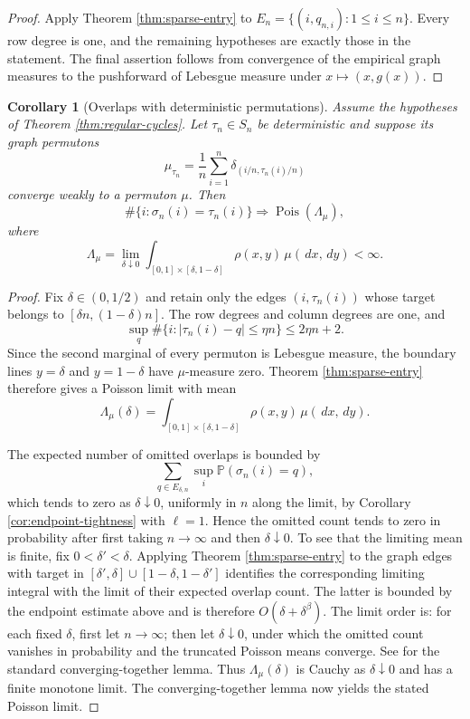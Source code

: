 \documentclass[11pt]{article}
\newtheorem{corollary}[theorem]{Corollary}
\theoremstyle{remark}
\newcommand{\Pp}{\mathbb P}
\newcommand{\Pois}{\operatorname{Pois}}
\newcommand{\dd}{\,d}
\begin{document}
\begin{proof}
Apply Theorem \ref{thm:sparse-entry} to
$E_n=\{(i,q_{n,i}):1\le i\le n\}$.  Every row degree is one, and the remaining
hypotheses are exactly those in the statement.  The final assertion follows
from convergence of the empirical graph measures to the pushforward of
Lebesgue measure under $x\mapsto(x,g(x))$.
\end{proof}

\begin{corollary}[Overlaps with deterministic permutations]\label{cor:overlap-permutation}
Assume the hypotheses of Theorem \ref{thm:regular-cycles}.  Let
$\tau_n\in S_n$ be deterministic and suppose its graph permutons
\[
        \mu_{\tau_n}=\frac1n\sum_{i=1}^n
        \delta_{(i/n,\tau_n(i)/n)}
\]
converge weakly to a permuton $\mu$.  Then
\[
        \#\{i:\sigma_n(i)=\tau_n(i)\}
        \Rightarrow\Pois(\Lambda_\mu),
\]
where
\[
        \Lambda_\mu=
        \lim_{\delta\downarrow0}
        \int_{[0,1]\times[\delta,1-\delta]}
        \rho(x,y)\,\mu(\dd x,\dd y)<\infty.
\]
\end{corollary}

\begin{proof}
Fix $\delta\in(0,1/2)$ and retain only the edges
$(i,\tau_n(i))$ whose target belongs to
$[\delta n,(1-\delta)n]$.  The row degrees and column degrees are one, and
\[
        \sup_q\#\{i:|\tau_n(i)-q|\le\eta n\}
        \le 2\eta n+2.
\]
Since the second marginal of every permuton is Lebesgue measure, the boundary
lines $y=\delta$ and $y=1-\delta$ have $\mu$-measure zero.  Theorem
\ref{thm:sparse-entry} therefore gives a Poisson limit with mean
\[
        \Lambda_\mu(\delta)=
        \int_{[0,1]\times[\delta,1-\delta]}
        \rho(x,y)\,\mu(\dd x,\dd y).
\]

The expected number of omitted overlaps is bounded by
\[
        \sum_{q\in E_{\delta,n}}
        \sup_i\Pp(\sigma_n(i)=q),
\]
which tends to zero as $\delta\downarrow0$, uniformly in $n$ along the limit,
by Corollary \ref{cor:endpoint-tightness} with $\ell=1$.  Hence the omitted
count tends to zero in probability after first taking $n\to\infty$ and then
$\delta\downarrow0$.  To see that the limiting mean is finite, fix $0<\delta'<\delta$.  Applying
Theorem \ref{thm:sparse-entry} to the graph edges with target in
$[\delta',\delta]\cup[1-\delta,1-\delta']$ identifies the corresponding
limiting integral with the limit of their expected overlap count.  The latter
is bounded by the endpoint estimate above and is therefore
$O(\delta+\delta^\beta)$.  
The limit order is: for each fixed \(\delta\), first let \(n\to\infty\);
then let \(\delta\downarrow0\), under which the omitted count vanishes in
probability and the truncated Poisson means converge.  See
\cite{Billingsley1999} for the standard converging-together lemma.
Thus $\Lambda_\mu(\delta)$ is Cauchy as
$\delta\downarrow0$ and has a finite monotone limit.  The
converging-together lemma now yields the stated Poisson limit.
\end{proof}
\end{document}
